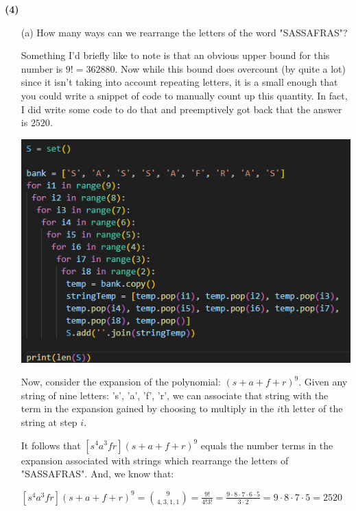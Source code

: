 \documentclass{book}
\newcommand{\exOne}{%
   \color{Purple}%
   \fontsize{13}{15}\selectfont%
}
\newcommand{\exP}{%
   \color{Purple}%
   \fontsize{12}{14}\selectfont%
}
\newenvironment{myIndent}{%
   \begin{adjustwidth}{2.5em}{0em}%
}{%
   \end{adjustwidth}%
}
\newcommand{\blab}[1]{\textbf{#1}}
\newcommand{\retTwo}{\hfill\bigbreak}
\begin{document}
\blab{(4)}
\begin{enumerate}
   \item[(a)] How many ways can we rearrange the letters of the word "SASSAFRAS"?
   
   \begin{myIndent}\exOne
      Something I'd briefly like to note is that an obvious upper bound for this\\ number is $9! = 362880$. Now while this bound does overcount (by quite a lot) since it isn't taking into account repeating letters, it is a small enough that you could write a snippet of code to manually count up this quantity. In fact, I did write some code to do that and preemptively got back that the answer is $2520$.\retTwo

      {\centering\includegraphics[scale=0.75]{188-HW2_Q4a.png}\retTwo\par}

      Now, consider the expansion of the polynomial: $(s + a + f + r)^9$. Given any string of nine letters: 's', 'a', 'f', 'r', we can associate that string with the term in the expansion gained by choosing to multiply in the $i$th letter of the string at step $i$.\retTwo

      It follows that $[s^4a^3fr](s + a + f + r)^9$ equals the number terms in the expansion associated with strings which rearrange the letters of "SASSAFRAS". And, we know that:

      {\centering\exP $[s^4a^3fr](s + a + f + r)^9 = \binom{9}{4, 3, 1, 1} = \frac{9!}{4!3!} = \frac{9\cdot 8 \cdot 7 \cdot 6 \cdot 5}{3 \cdot 2} = 9\cdot 8\cdot 7 \cdot 5 = 2520$ \newpage\par}
   \end{myIndent}


\end{enumerate}
\end{document}
